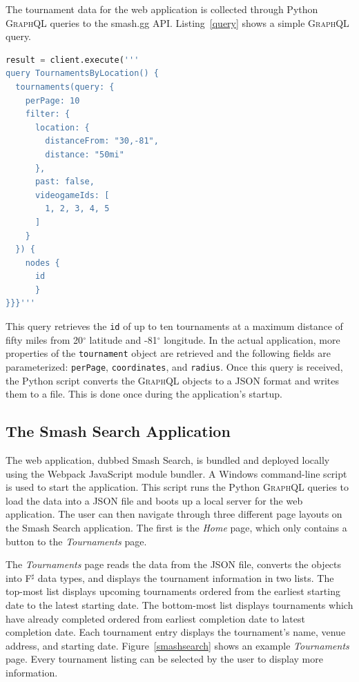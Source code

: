 \documentclass[sigconf]{acmart}
\begin{document}
The tournament data for the web application is collected through Python \textsc{GraphQL} queries to the smash.gg \textsc{API}. Listing~\ref{query} shows a simple \textsc{GraphQL} query.

\begin{lstlisting}[language=Python, caption=Python \textsc{GraphQL} query example., label=query]
result = client.execute('''
query TournamentsByLocation() {
  tournaments(query: {
    perPage: 10
    filter: {
      location: {
        distanceFrom: "30,-81",
        distance: "50mi"
      },
      past: false,
      videogameIds: [
        1, 2, 3, 4, 5
      ]
    }
  }) {
    nodes {
      id
      }
}}}'''
\end{lstlisting}

This query retrieves the \texttt{id} of up to ten tournaments at a maximum distance of fifty miles from 20$^{\circ}$ latitude and -81$^{\circ}$ longitude. In the actual application, more properties of the \texttt{tournament} object are retrieved and the following fields are parameterized: \texttt{perPage}, \texttt{coordinates}, and \texttt{radius}. Once this query is received, the Python script converts the \textsc{GraphQL} objects to a \textsc{JSON} format and writes them to a file. This is done once during the application's startup. 

\subsection{The Smash Search Application}

The web application, dubbed Smash Search, is bundled and deployed locally using the Webpack JavaScript module bundler. A Windows command-line script is used to start the application. This script runs the Python \textsc{GraphQL} queries to load the data into a \textsc{JSON} file and boots up a local server for the web application. The user can then navigate through three different page layouts on the Smash Search application. The first is the \textit{Home} page, which only contains a button to the \textit{Tournaments} page.

The \textit{Tournaments} page reads the data from the \textsc{JSON} file, converts the objects into F$^{\sharp}$ data types, and displays the tournament information in two lists. The top-most list displays upcoming tournaments ordered from the earliest starting date to the latest starting date. The bottom-most list displays tournaments which have already completed ordered from earliest completion date to latest completion date. Each tournament entry displays the tournament's name, venue address, and starting date. Figure~\ref{smashsearch} shows an example \textit{Tournaments} page. Every tournament listing can be selected by the user to display more information.
\end{document}
